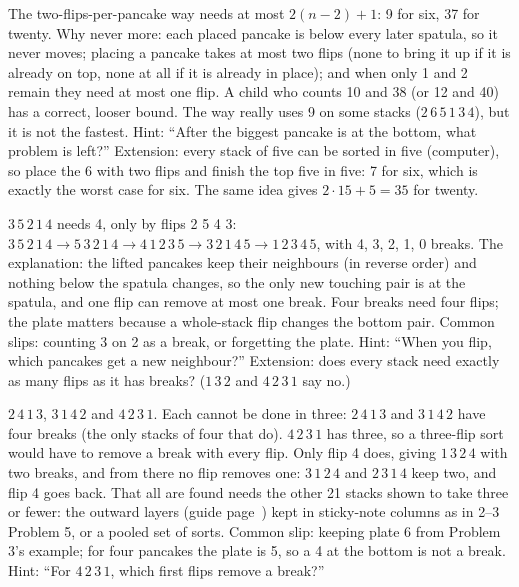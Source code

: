 The two-flips-per-pancake way needs at most $2(n-2)+1$: 9 for six, 37 for twenty. Why never more: each placed pancake is below every later spatula, so it never moves; placing a pancake takes at most two flips (none to bring it up if it is already on top, none at all if it is already in place); and when only 1 and 2 remain they need at most one flip. A child who counts 10 and 38 (or 12 and 40) has a correct, looser bound. The way really uses 9 on some stacks ($2\,6\,5\,1\,3\,4$), but it is not the fastest. Hint: ``After the biggest pancake is at the bottom, what problem is left?'' Extension: every stack of five can be sorted in five (computer), so place the 6 with two flips and finish the top five in five: 7 for six, which is exactly the worst case for six. The same idea gives $2\cdot15+5=35$ for twenty.

$3\,5\,2\,1\,4$ needs 4, only by flips 2 5 4 3: $3\,5\,2\,1\,4 \to 5\,3\,2\,1\,4 \to 4\,1\,2\,3\,5 \to 3\,2\,1\,4\,5 \to 1\,2\,3\,4\,5$, with 4, 3, 2, 1, 0 breaks. The explanation: the lifted pancakes keep their neighbours (in reverse order) and nothing below the spatula changes, so the only new touching pair is at the spatula, and one flip can remove at most one break. Four breaks need four flips; the plate matters because a whole-stack flip changes the bottom pair. Common slips: counting 3 on 2 as a break, or forgetting the plate. Hint: ``When you flip, which pancakes get a new neighbour?'' Extension: does every stack need exactly as many flips as it has breaks? ($1\,3\,2$ and $4\,2\,3\,1$ say no.)

$2\,4\,1\,3$, $3\,1\,4\,2$ and $4\,2\,3\,1$. Each cannot be done in three: $2\,4\,1\,3$ and $3\,1\,4\,2$ have four breaks (the only stacks of four that do). $4\,2\,3\,1$ has three, so a three-flip sort would have to remove a break with every flip. Only flip 4 does, giving $1\,3\,2\,4$ with two breaks, and from there no flip removes one: $3\,1\,2\,4$ and $2\,3\,1\,4$ keep two, and flip 4 goes back. That all are found needs the other 21 stacks shown to take three or fewer: the outward layers (guide page~\pageref{tab:four}) kept in sticky-note columns as in 2--3 Problem 5, or a pooled set of sorts. Common slip: keeping plate 6 from Problem 3's example; for four pancakes the plate is 5, so a 4 at the bottom is not a break. Hint: ``For $4\,2\,3\,1$, which first flips remove a break?''

